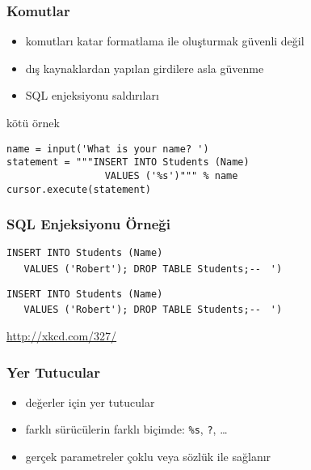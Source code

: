 \documentclass[dvipsnames]{beamer}
\theoremstyle{plain}
\begin{document}
\begin{frame}[fragile]
  \frametitle{Komutlar}

  \begin{itemize}
    \item komutları katar formatlama ile oluşturmak güvenli değil
    \item dış kaynaklardan yapılan girdilere asla güvenme
    \item \alert{SQL enjeksiyonu} saldırıları
  \end{itemize}

  \medskip
  \begin{exampleblock}{kötü örnek}
    \begin{lstlisting}
name = input('What is your name? ')
statement = """INSERT INTO Students (Name)
                 VALUES ('%s')""" % name
cursor.execute(statement)
    \end{lstlisting}
  \end{exampleblock}
\end{frame}

\begin{frame}[fragile]
  \frametitle{SQL Enjeksiyonu Örneği}

  \begin{center}
  \end{center}

  \vspace{-6pt}
  \lstinline[language=FullSQL]!INSERT INTO Students (Name)!\\
  \lstinline[language=FullSQL]!   VALUES ('!\alert{\lstinline!Robert'); DROP TABLE Students;-- !}
  \lstinline[language=FullSQL]!')!

  \lstinline[language=FullSQL]!INSERT INTO Students (Name)!\\
  \lstinline[language=FullSQL]!   VALUES ('Robert'); DROP TABLE Students;-- !
  \lstinline[language=FullSQL]!')!

  \begin{tiny}
    \url{http://xkcd.com/327/}
  \end{tiny}
\end{frame}

\begin{frame}[fragile]
  \frametitle{Yer Tutucular}

  \begin{itemize}
    \item değerler için yer tutucular
    \item farklı sürücülerin farklı biçimde:
      \lstinline!%s!, \lstinline!?!, \ldots
    \item gerçek parametreler çoklu veya sözlük ile sağlanır
  \end{itemize}
\end{frame}
\end{document}
